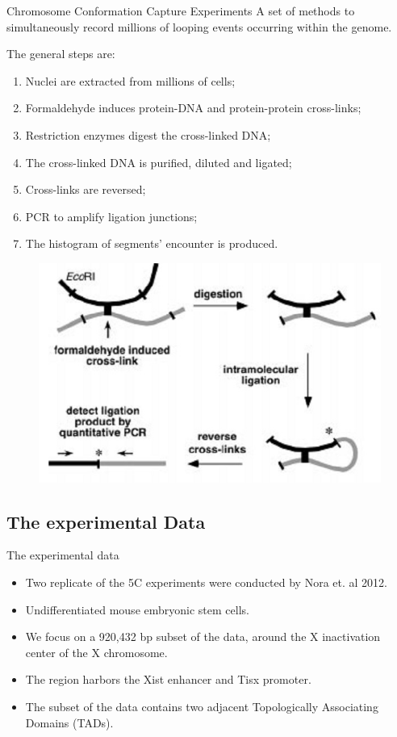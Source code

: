 \documentclass[8pt]{beamer}
\begin{document}
\begin{frame}{Chromosome Conformation Capture Experiments}
A set of methods to simultaneously record millions of looping events occurring within the genome. 

The general steps are:
\begin{enumerate}
\item Nuclei are extracted from millions of cells;
\item Formaldehyde induces protein-DNA and protein-protein cross-links;
\item Restriction enzymes digest the cross-linked DNA;
\item The cross-linked DNA is purified, diluted and ligated;
\item Cross-links are reversed;
\item PCR to amplify ligation junctions;
\item The histogram of segments' encounter is produced.
\end{enumerate}
\begin{figure}[H]
\includegraphics[scale=0.3]{3Cschematic}
\end{figure}
\end{frame}

\subsection{The experimental Data}\label{subsection_theExperimentalData}

\begin{frame}{The experimental data}
\begin{itemize}
\item Two replicate of the 5C experiments were conducted by Nora et. al 2012. 
\item Undifferentiated mouse embryonic stem cells.
\item We focus on a 920,432 bp subset of the data, around the X inactivation center of the X chromosome. 
\item The region harbors the Xist enhancer and Tisx promoter.
\item The subset of the data contains two adjacent Topologically Associating Domains (TADs).
\end{itemize}
\end{frame}
\end{document}
